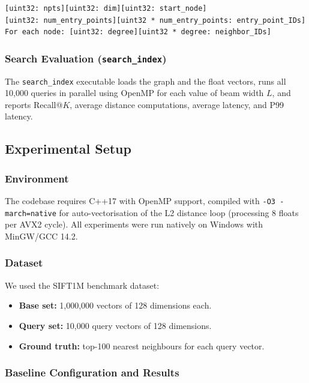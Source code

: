 \documentclass[10pt]{article}
\begin{document}
\begin{verbatim}
[uint32: npts][uint32: dim][uint32: start_node]
[uint32: num_entry_points][uint32 * num_entry_points: entry_point_IDs]
For each node: [uint32: degree][uint32 * degree: neighbor_IDs]
\end{verbatim}

\subsubsection{Search Evaluation (\texttt{search\_index})}

The \texttt{search\_index} executable loads the graph and the float vectors, runs all 10,000 queries in parallel using OpenMP for each value of beam width $L$, and reports Recall@$K$, average distance computations, average latency, and P99 latency.

\subsection{Experimental Setup}

\subsubsection{Environment}

The codebase requires C++17 with OpenMP support, compiled with \texttt{-O3 -march=native} for auto-vectorisation of the L2 distance loop (processing 8 floats per AVX2 cycle). All experiments were run natively on Windows with MinGW/GCC 14.2.

\subsubsection{Dataset}

We used the SIFT1M benchmark dataset:
\begin{itemize}
    \item \textbf{Base set:} 1,000,000 vectors of 128 dimensions each.
    \item \textbf{Query set:} 10,000 query vectors of 128 dimensions.
    \item \textbf{Ground truth:} top-100 nearest neighbours for each query vector.
\end{itemize}

\subsubsection{Baseline Configuration and Results}
\end{document}
